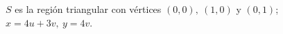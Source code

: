 \item $S$ es la región triangular con vértices $(0, 0), \ (1, 0)$ y $(0, 1)$; $x = 4u + 3v, \ y = 4v$.
